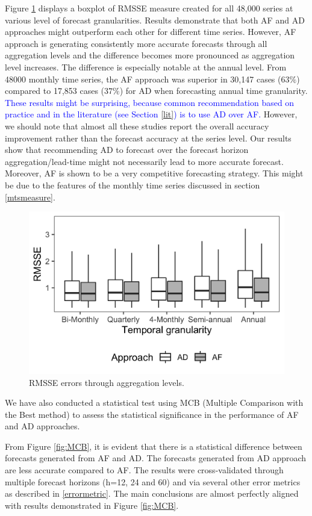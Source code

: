 \documentclass[preprint, 3p,
authoryear]{elsarticle} %
\begin{document}
Figure \ref{fig:RMSSE} displays a boxplot of RMSSE measure created for
all 48,000 series at various level of forecast granularities. Results
demonstrate that both AF and AD approaches might outperform each other
for different time series. However, AF approach is generating
consistently more accurate forecasts through all aggregation levels and
the difference becomes more pronounced as aggregation level increases.
The difference is especially notable at the annual level. From 48000
monthly time series, the AF approach was superior in 30,147 cases
(\(63\%\)) compared to 17,853 cases (\(37\%\)) for AD when forecasting
annual time granularity.
\textcolor{blue}{These results might be surprising, because common recommendation based on practice and in the literature (see Section \ref{lit}) is to use AD over AF.}
However, we should note that almost all these studies report the overall
accuracy improvement rather than the forecast accuracy at the series
level. Our results show that recommending AD to forecast over the
forecast horizon aggregation/lead-time might not necessarily lead to
more accurate forecast. Moreover, AF is shown to be a very competitive
forecasting strategy. This might be due to the features of the monthly
time series discussed in section \ref{mtsmeasure}.

\begin{figure}[H]

{\centering \includegraphics[width=0.7\linewidth]{img/box_plot_rmsse} 

}

\caption{RMSSE errors through aggregation levels.}\label{fig:RMSSE}
\end{figure}

We have also conducted a statistical test using MCB (Multiple Comparison
with the Best method) \citep{MCB} to assess the statistical significance
in the performance of AF and AD approaches.

From Figure \ref{fig:MCB}, it is evident that there is a statistical
difference between forecasts generated from AF and AD. The forecasts
generated from AD approach are less accurate compared to AF. The results
were cross-validated through multiple forecast horizons (h=12, 24 and
60) and via several other error metrics as described in
\ref{errormetric}. The main conclusions are almost perfectly aligned
with results demonstrated in Figure \ref{fig:MCB}.
\end{document}
